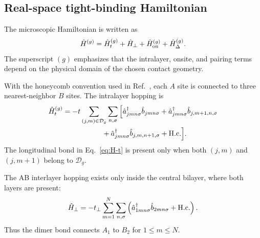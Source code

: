 \subsection{Real-space tight-binding Hamiltonian}
\label{subsec:hamiltonian}

The microscopic Hamiltonian is written as
\begin{equation}
	\hat H^{(g)}
	=
	\hat H_t^{(g)}
	+
	\hat H_\perp
	+
	\hat H_{\rm on}^{(g)}
	+
	\hat H_\Delta^{(g)} .
	\label{eq:H-total}
\end{equation}
The superscript $(g)$ emphasizes that the intralayer, onsite, and pairing terms depend on the physical domain of the chosen contact geometry.

With the honeycomb convention used in Ref.~, each $A$ site is connected to three nearest-neighbor $B$ sites.  The intralayer hopping is
\begin{align}
	\hat H_t^{(g)}
	 & =-t
	\sum_{(j,m)\in\mathcal D_g}
	\sum_{n,\sigma}
	\Big[
		\hat a_{jmn\sigma}^{\dagger}\hat b_{jmn\sigma}
		+
		\hat a_{jmn\sigma}^{\dagger}\hat b_{j,m+1,n,\sigma}
	\notag            \\
	 & \hspace{5.5em}
		+
		\hat a_{jmn\sigma}^{\dagger}\hat b_{j,m,n+1,\sigma}
		+\mathrm{H.c.}
		\Big].
	\label{eq:H-t}
\end{align}
The longitudinal bond in Eq.~\eqref{eq:H-t} is present only when both $(j,m)$ and $(j,m+1)$ belong to $\mathcal D_g$.

The AB interlayer hopping exists only inside the central bilayer, where both layers are present:
\begin{equation}
	\hat H_\perp
	=
	-t_\perp
	\sum_{m=1}^{N}
	\sum_{n,\sigma}
	\left(
	\hat a_{1mn\sigma}^{\dagger}
	\hat b_{2mn\sigma}
	+\mathrm{H.c.}
	\right).
	\label{eq:H-perp}
\end{equation}
Thus the dimer bond connects $A_1$ to $B_2$ for $1\le m\le N$.

